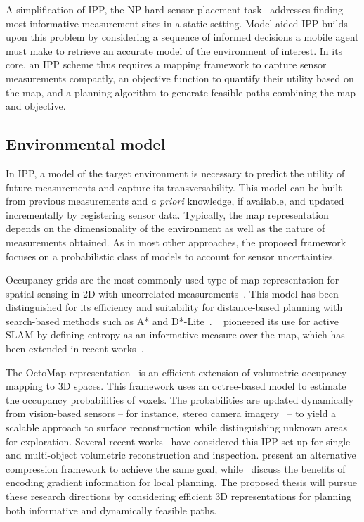A simplification of IPP, the NP-hard sensor placement task~\cite{Krause2008} addresses finding most 
informative 
measurement sites in a static setting. Model-aided IPP builds upon this problem by considering a sequence 
of informed decisions a mobile agent must make to retrieve an accurate model of the environment of interest. 
In its core, an IPP scheme thus requires a mapping framework to capture sensor measurements compactly, an 
objective function to quantify their utility based on the map, and a planning algorithm to generate feasible 
paths combining the map and objective.

\subsection{Environmental model}

In IPP, a model of the target environment is necessary to predict the utility of future 
measurements and capture its transversability. This model can be built from previous measurements and 
\textit{a priori} knowledge, if available, and updated incrementally by registering sensor data. Typically, 
the map representation depends on the dimensionality of the environment as well as the nature of measurements 
obtained. As in most other approaches, the proposed framework focuses on a probabilistic class of models to 
account for sensor uncertainties.

Occupancy grids are the most commonly-used type of map representation for spatial sensing in 
2D with uncorrelated measurements~\cite{Elfes1989}. This model has been distinguished for its 
efficiency and suitability for distance-based planning with search-based methods such as A* and 
D*-Lite~\cite{Koenig2002}. ~\citet{Bourgault2002} pioneered its use for active SLAM by defining entropy as 
an informative measure over the map, which has been extended in recent works~\cite{Carrillo2015a}.

The OctoMap representation~\cite{Hornung2013} is an efficient extension of volumetric occupancy 
mapping to 3D spaces. This framework uses an octree-based model to estimate the occupancy probabilities of 
voxels. The probabilities are updated dynamically from vision-based sensors – for instance, stereo 
camera imagery~\cite{Isler2016} – to yield a scalable approach to surface reconstruction while 
distinguishing unknown areas for exploration. Several recent 
works~\cite{Heng2015,Bircher2016,Charrow2015a,Isler2016} have considered this IPP set-up for single- 
and multi-object volumetric reconstruction and inspection. \citet{Nelson2015} present an alternative 
compression framework to achieve the same goal, while~\citet{Oleynikova2016} discuss the 
benefits of encoding gradient information for local planning. The proposed thesis will pursue these research 
directions by considering efficient 3D representations for planning both informative and dynamically 
feasible paths.

